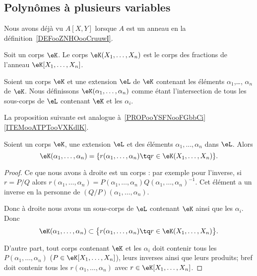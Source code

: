 \subsection{Polynômes à plusieurs variables}

Nous avons déjà vu \( A[X,Y]\) lorsque \( A\) est un anneau en la définition~\ref{DEFooZNHOooCruuwI}.

\begin{definition}      \label{DEFooRHRKooPqLNOp}
    Soit un corps \( \eK\). Le corps \( \eK(X_1,\ldots, X_n)\) est le corps des fractions de l'anneau \( \eK[X_1,\ldots, X_n]\).
\end{definition}

\begin{definition}  \label{DEFooOCPHooXneutp}
    Soient un corps \( \eK\) et une extension \( \eL\) de \( \eK\) contenant les éléments \( \alpha_1\),\ldots, \( \alpha_n\) de \( \eK\). Nous définissons \( \eK(\alpha_1,\ldots, \alpha_n)\) comme étant l'intersection de tous les sous-corps de \( \eL\) contenant \( \eK\) et les \( \alpha_i\).
\end{definition}

La proposition suivante est analogue à~\ref{PROPooYSFNooFGbbCi}\ref{ITEMooATPTooVXKdlK}.

\begin{lemma}        \label{LEMooQEJHooAmSNxU}
    Soient un corps \( \eK\), une extension \( \eL\) et des éléments \( \alpha_1,\ldots, \alpha_n\) dans \( \eL\). Alors
    \begin{equation}
        \eK(\alpha_1,\ldots, \alpha_n)=\{ r(\alpha_1,\ldots, \alpha_n)\tq r\in \eK(X_1,\ldots, X_n) \}.
    \end{equation}
\end{lemma}

\begin{proof}
    Ce que nous avons à droite est un corps : par exemple pour l'inverse, si \( r=P/Q\) alors \( r(\alpha_1,\ldots,\alpha_n)=P(\alpha_1,\ldots, \alpha_n)Q(\alpha_1,\ldots, \alpha_n)^{-1}\). Cet élément a un inverse en la personne de \( (Q/P)(\alpha_1,\ldots, \alpha_n)\).

    Donc à droite nous avons un sous-corps de \( \eL\) contenant \( \eK\) ainsi que les \( \alpha_i\). Donc
    \begin{equation}
        \eK(\alpha_1,\ldots, \alpha_n)\subset \big\{ r(\alpha_1,\ldots, \alpha_n)\tq r\in \eK(X_1,\ldots, X_n) \big\}.
    \end{equation}

    D'autre part, tout corps contenant \( \eK\) et les \( \alpha_i\) doit contenir tous les \( P(\alpha_1,\ldots, \alpha_n)\) (\( P\in \eK[X_1,\ldots, X_n]\)), leurs inverses ainsi que leurs produits; bref doit contenir tous les \( r(\alpha_1,\ldots, \alpha_n)\) avec \( r\in\eK[X_1,\ldots, X_n]\).
\end{proof}
